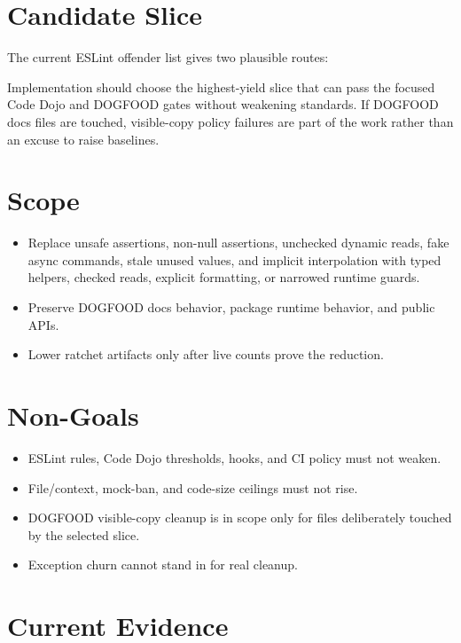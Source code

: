 \section{Candidate Slice}\label{record-228-candidate-slice}

The current ESLint offender list gives two plausible routes:



Implementation should choose the highest-yield slice that can pass the focused Code Dojo and DOGFOOD gates without weakening standards. If DOGFOOD docs files are touched, visible-copy policy failures are part of the work rather than an excuse to raise baselines.

\section{Scope}\label{record-228-scope}

\begin{itemize}
\tightlist
\item
  Replace unsafe assertions, non-null assertions, unchecked dynamic reads, fake async commands, stale unused values, and implicit interpolation with typed helpers, checked reads, explicit formatting, or narrowed runtime guards.
\item
  Preserve DOGFOOD docs behavior, package runtime behavior, and public APIs.
\item
  Lower ratchet artifacts only after live counts prove the reduction.
\end{itemize}

\section{Non-Goals}\label{record-228-non-goals}

\begin{itemize}
\tightlist
\item
  ESLint rules, Code Dojo thresholds, hooks, and CI policy must not weaken.
\item
  File/context, mock-ban, and code-size ceilings must not rise.
\item
  DOGFOOD visible-copy cleanup is in scope only for files deliberately touched by the selected slice.
\item
  Exception churn cannot stand in for real cleanup.
\end{itemize}

\section{Current Evidence}\label{record-228-current-evidence}

